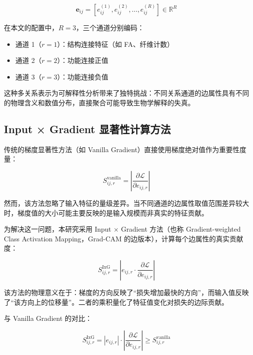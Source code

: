 \begin{equation}
\mathbf{e}_{ij} = [e_{ij}^{(1)}, e_{ij}^{(2)}, \ldots, e_{ij}^{(R)}] \in \mathbb{R}^R
\end{equation}

在本文的配置中，$R = 3$，三个通道分别编码：
\begin{itemize}
    \item 通道 1（$r=1$）：结构连接特征（如 FA、纤维计数）
    \item 通道 2（$r=2$）：功能连接正值
    \item 通道 3（$r=3$）：功能连接负值
\end{itemize}

这种多关系表示为可解释性分析带来了独特挑战：不同关系通道的边属性具有不同的物理含义和数值分布，直接聚合可能导致生物学解释的失真。

\subsection{Input × Gradient 显著性计算方法}

传统的梯度显著性方法（如 Vanilla Gradient）直接使用梯度绝对值作为重要性度量：

\begin{equation}
S_{ij,r}^{\text{vanilla}} = \left| \frac{\partial \mathcal{L}}{\partial e_{ij,r}} \right|
\end{equation}

然而，该方法忽略了输入特征的量级差异。当不同通道的边属性取值范围差异较大时，梯度值的大小可能主要反映的是输入规模而非真实的特征贡献。

为解决这一问题，本研究采用 Input × Gradient 方法（也称 Gradient-weighted Class Activation Mapping，Grad-CAM 的边版本），计算每个边属性的真实贡献度：

\begin{equation}
S_{ij,r}^{\text{IxG}} = \left| e_{ij,r} \cdot \frac{\partial \mathcal{L}}{\partial e_{ij,r}} \right|
\end{equation}

该方法的物理意义在于：梯度的方向反映了``损失增加最快的方向''，而输入值反映了``该方向上的位移量''。二者的乘积量化了特征值变化对损失的边际贡献。

与 Vanilla Gradient 的对比：

\begin{equation}
S_{ij,r}^{\text{IxG}} = |e_{ij,r}| \cdot \left| \frac{\partial \mathcal{L}}{\partial e_{ij,r}} \right| \geq S_{ij,r}^{\text{vanilla}}
\end{equation}

